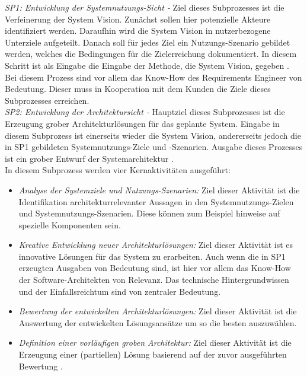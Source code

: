 \emph{SP1: Entwicklung der Systemnutzungs-Sicht -}
Ziel dieses Subprozesses ist die Verfeinerung der System Vision. Zun\"achst sollen hier potenzielle Akteure identifiziert werden. Daraufhin wird die System Vision in nutzerbezogene Unterziele aufgeteilt. Danach soll f\"ur jedes Ziel ein Nutzungs-Szenario gebildet werden, welches die Bedingungen f\"ur die Zielerreichung dokumentiert. In diesem Schritt ist als Eingabe die Eingabe der Methode, die System Vision, gegeben \cite{Poh01}. Bei diesem Prozess sind vor allem das Know-How des Requirements Engineer von Bedeutung. Dieser muss in Kooperation mit dem Kunden die Ziele dieses Subprozesses erreichen.\\

\emph{SP2: Entwicklung der Architektursicht -}
Hauptziel dieses Subprozesses ist die Erzeugung grober Architekturl\"osungen f\"ur das geplante System. Eingabe in diesem Subprozess ist einerseits wieder die System Vision, andererseits jedoch die in SP1 gebildeten Systemnutzungs-Ziele und -Szenarien. Ausgabe dieses Prozesses ist ein grober Entwurf der Systemarchitektur \cite{Poh01}.\\

In diesem Subprozess werden vier Kernaktivit\"aten ausgef\"uhrt:\\

\begin{itemize}
\item \emph{Analyse der Systemziele und Nutzungs-Szenarien:} Ziel dieser Aktivit\"at ist die Identifikation architekturrelevanter Aussagen in den Systemnutzungs-Zielen und Systemnutzungs-Szenarien. Diese k\"onnen zum Beispiel hinweise auf spezielle Komponenten sein. 
\item \emph{Kreative Entwicklung neuer Architekturl\"osungen:} Ziel dieser Aktivit\"at ist es innovative L\"osungen f\"ur das System zu erarbeiten. Auch wenn die in SP1 erzeugten Ausgaben von Bedeutung sind, ist hier vor allem das Know-How der Software-Architekten von Relevanz. Das technische Hintergrundwissen und der Einfallsreichtum sind von zentraler Bedeutung.
\item \emph{Bewertung der entwickelten Architekturl\"osungen:} Ziel dieser Aktivit\"at ist die Auswertung der entwickelten L\"osungsans\"atze um so die besten auszuw\"ahlen. 
\item \emph{Definition einer vorl\"aufigen groben Architektur:} Ziel dieser Aktivit\"at ist die Erzeugung einer (partiellen) L\"osung basierend auf der zuvor ausgef\"uhrten Bewertung \cite{Poh01}.\\
\end{itemize} 

